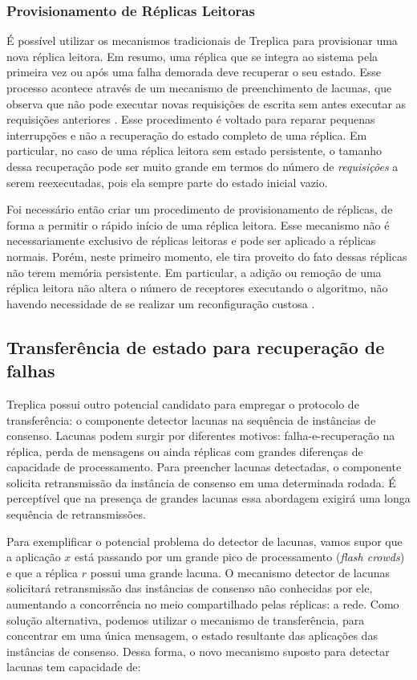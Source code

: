 \subsubsection{Provisionamento de Réplicas Leitoras}

É possível utilizar os mecanismos tradicionais de Treplica para provisionar uma nova
réplica leitora. Em resumo, uma réplica que se integra ao sistema pela primeira vez ou
após uma falha demorada deve recuperar o seu estado. Esse processo acontece através de um
mecanismo de preenchimento de lacunas, que observa que não pode executar novas requisições
de escrita sem antes executar as requisições anteriores \cite{vieira-tr10b}. Esse
procedimento é voltado para reparar pequenas interrupções e não a recuperação do estado
completo de uma réplica. Em particular, no caso de uma réplica leitora sem estado
persistente, o tamanho dessa recuperação pode ser muito grande em termos do número de
\emph{requisições} a serem reexecutadas, pois ela sempre parte do estado inicial vazio.

Foi necessário então criar um procedimento de provisionamento de réplicas, de forma a
permitir o rápido início de uma réplica leitora. Esse mecanismo não é necessariamente
exclusivo de réplicas leitoras e pode ser aplicado a réplicas normais. Porém, neste
primeiro momento, ele tira proveito do fato dessas réplicas não terem memória persistente.
Em particular, a adição ou remoção de uma réplica leitora não altera o número de
receptores executando o algoritmo, não havendo necessidade de se realizar um
reconfiguração custosa \cite{lamport10}.

\subsection{Transferência de estado para recuperação de falhas}

Treplica possui outro potencial candidato para empregar o protocolo de transferência: o
componente detector lacunas na sequência de instâncias de consenso. Lacunas podem surgir
por diferentes motivos: falha-e-recuperação na réplica, perda de mensagens ou ainda
réplicas com grandes diferenças de capacidade de processamento. Para preencher lacunas
detectadas, o componente solicita retransmissão da instância de consenso em uma
determinada rodada. É perceptível que na presença de grandes lacunas essa abordagem
exigirá uma longa sequência de retransmissões.

Para exemplificar o potencial problema do detector de lacunas, vamos supor que a aplicação
$x$ está passando por um grande pico de processamento (\emph{flash crowds}) e que a
réplica $r$ possui uma grande lacuna. O mecanismo detector de lacunas solicitará
retransmissão das instâncias de consenso não conhecidas por ele, aumentando a concorrência
no meio compartilhado pelas réplicas: a rede. Como solução alternativa, podemos utilizar o
mecanismo de transferência, para concentrar em uma única mensagem, o estado resultante das
aplicações das instâncias de consenso. Dessa forma, o novo mecanismo suposto para detectar
lacunas tem capacidade de:

